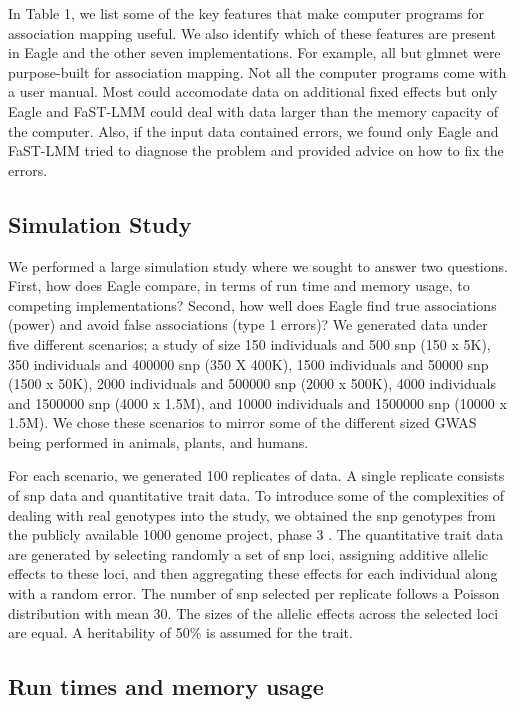 \documentclass{nature}
\begin{document}
 In Table 1, 
we list some of the key features that make computer programs for association mapping useful. We also identify which of these 
features are present in Eagle and the other seven implementations. For example, all but glmnet were purpose-built for 
association mapping. Not all the computer programs come with a user manual.  Most could accomodate data on additional fixed effects but only Eagle and FaST-LMM could deal with data larger than the memory capacity of the computer. Also, if 
the input data contained errors, we found only Eagle and FaST-LMM tried to diagnose the problem and 
provided advice on how to fix the errors. 


\subsection{Simulation Study}
We performed a large simulation study where we sought to  answer two questions. 
First, how does Eagle compare, in terms of run time and memory usage, to 
competing implementations? Second, how well does Eagle find true associations (power) and avoid 
false associations (type 1 errors)? We generated data under five different scenarios; a study of size 150 individuals 
and 500 snp (150 x 5K),  350 individuals and 400000 snp (350 X 400K),  1500 individuals and 
50000 snp (1500 x 50K), 2000 individuals and 500000 snp (2000 x 500K), 4000 individuals and 
1500000 snp (4000 x 1.5M), and 10000 individuals and 1500000 snp (10000 x 1.5M).   
We chose these scenarios to mirror some of the different sized GWAS being performed in animals, plants, and humans. 

For each scenario, we generated 100 replicates of data. A single replicate consists of snp data and quantitative trait data. 
To introduce some of the complexities of dealing with real genotypes into the study, we obtained the snp genotypes from 
the publicly available 1000 genome project, phase 3  \cite{10002010map}.  The quantitative trait data are generated 
by selecting randomly a set of snp loci, assigning additive allelic effects to these loci, and then aggregating these effects for 
each individual along with a random error.  
 The number of snp selected per replicate follows a Poisson distribution with mean 30. The sizes of the allelic effects 
 across the selected loci are equal.  A heritability of  50\% is assumed for the trait. 
 



\subsection{Run times and memory usage}
\end{document}
